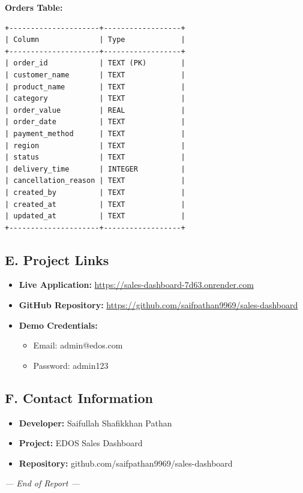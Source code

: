 \documentclass[12pt,a4paper]{article}
\begin{document}
\textbf{Orders Table:}
\begin{verbatim}
+---------------------+------------------+
| Column              | Type             |
+---------------------+------------------+
| order_id            | TEXT (PK)        |
| customer_name       | TEXT             |
| product_name        | TEXT             |
| category            | TEXT             |
| order_value         | REAL             |
| order_date          | TEXT             |
| payment_method      | TEXT             |
| region              | TEXT             |
| status              | TEXT             |
| delivery_time       | INTEGER          |
| cancellation_reason | TEXT             |
| created_by          | TEXT             |
| created_at          | TEXT             |
| updated_at          | TEXT             |
+---------------------+------------------+
\end{verbatim}

\subsection{E. Project Links}

\begin{itemize}[leftmargin=*]
    \item \textbf{Live Application:} \url{https://sales-dashboard-7d63.onrender.com}
    \item \textbf{GitHub Repository:} \url{https://github.com/saifpathan9969/sales-dashboard}
    \item \textbf{Demo Credentials:}
    \begin{itemize}
        \item Email: admin@edos.com
        \item Password: admin123
    \end{itemize}
\end{itemize}

\subsection{F. Contact Information}

\begin{itemize}[leftmargin=*]
    \item \textbf{Developer:} Saifullah Shafikkhan Pathan
    \item \textbf{Project:} EDOS Sales Dashboard
    \item \textbf{Repository:} github.com/saifpathan9969/sales-dashboard
\end{itemize}

\vspace{2cm}

\begin{center}
\textit{--- End of Report ---}
\end{center}
\end{document}
